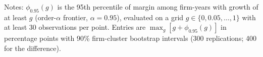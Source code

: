 \begin{table}[t]\centering\small
\caption{Frontier Rule-of-40 score by period: maximum of $g+\phi_{0.95}(g)$ on the order-$\alpha$ Pareto frontier}\label{tab:frontier}
\par\vspace{2pt}\footnotesize\raggedright Notes: $\phi_{0.95}(g)$ is the 95th percentile of margin among firm-years with growth of at least $g$ (order-$\alpha$ frontier, $\alpha=0.95$), evaluated on a grid $g\in\{0,0.05,\dots,1\}$ with at least 30 observations per point. Entries are $\max_g[g+\phi_{0.95}(g)]$ in percentage points with 90\% firm-cluster bootstrap intervals (300 replications; 400 for the difference).
\end{table}